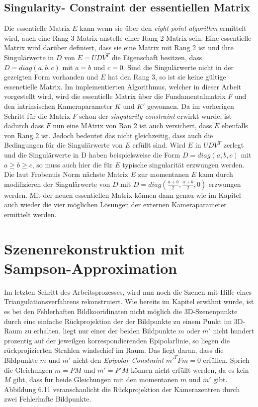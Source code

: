 \pagebreak

\subsection{Singularity- Constraint der essentiellen Matrix}

Die essentielle Matrix $E$ kann wenn sie über den \textit{eight-point-algorithm} ermittelt wird, auch eine Rang 3 Matrix anstelle einer Rang 2 Matrix sein. Eine essentielle Matrix wird darüber definiert, dass sie eine Matrix mit Rang 2 ist und ihre Singulärwerte in $D$ von $E = UDV^T$ die Eigenschaft besitzen, dass $ D = diag(a,b,c)$ mit $a=b$ und $c=0$. Sind die Singulärwerte nicht in der gezeigten Form vorhanden und $E$ hat den Rang 3, so ist sie keine gültige essenetielle Matrix\cite{HZ}. Im implementierten Algorithmus, welcher in dieser Arbeit vorgestellt wird, wird die essentielle Matrix über die Fundamentalmatrix $F$ und den intrinsischen Kameraparameter $K$ und $K'$ gewonnen. Da im vorherigen Schritt für die Matrix $F$ schon der \textit{singularity-constraint} erwirkt wurde, ist dadurch dass $F$ nun eine MAtrix von Ran 2 ist auch versichert, dass $E$ ebenfalls von Rang 2 ist. Jedoch bedeutet das nicht gleichzeitig, dass auch die Bedingungen für die Singulärwerte von $E$ erfüllt sind. Wird $E$ in $UDV^T$ zerlegt und die Singulärwerte in D haben beispielsweise die Form $D= diag(a,b,c)$ mit $a \geq b \geq c $, so muss auch hier die für $E$ typische singularität erzwungen werden. Die laut Frobenuis Norm nächste Matrix $E$ zur momentanen $E$ kann durch modifizieren der Singulärwerte von $D$ mit $D=diag(\frac{a+b}{2},\frac{a+b}{2},0)$ erzwungen werden\cite{HZ}. Mit der neuen essentiellen Matrix können dann genau wie im Kapitel  auch wieder die vier möglichen Lösungen der externen Kameraparameter ermittelt werden. 

\section{Szenenrekonstruktion mit Sampson-Approximation}

Im letzten Schritt des Arbeitsprozesses, wird nun noch die Szenen mit Hilfe eines Triangulationsverfahrens rekonstruiert. Wie bereits im Kapitel  erwähnt wurde, ist es bei den Fehlerhaften Bildkooridinaten nicht möglich die 3D-Szenenpunkte durch eine einfache Rückprojektion der der Bildpunkte zu einem Punkt im 3D-Raum zu erhalten. liegt nur einer der beiden Bildpunkte $m$ oder $m'$ nicht hundert prozentig auf der jeweilgen korrespondierenden Epipolarlinie, so liegen die rückprojizierten Strahlen windschief im Raum. Das liegt daran, dass die Bildpunkte $m$ und $m'$ nicht den \textit{Epipolar-Constraint} $m'^T F m = 0$ erfüllen. Sprich die Gleichungen $m = PM$ und $m' = P'M$ können nicht erfüllt werden, da es kein $M$ gibt, dass für beide Gleichungen mit den momentanen $m$ und $m'$ gibt. Abbildung 6.11 veranschaulicht die Rückprojektion der Kamerazentren durch zwei Fehlerhafte Bildpunkte. 

